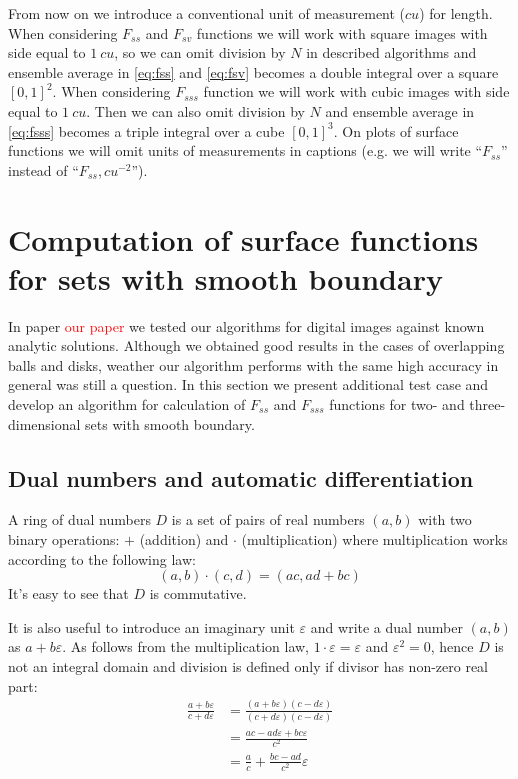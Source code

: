 \documentclass[reprint,amsmath,amssymb,aps,pre,showkeys,showpacs]{revtex4-1}
\begin{document}
From now on we introduce a conventional unit of measurement ($cu$) for length.
When considering $F_{ss}$ and $F_{sv}$ functions we will work with square images
with side equal to $1\ cu$, so we can omit division by $N$ in described
algorithms and ensemble average in \cref{eq:fss} and \cref{eq:fsv} becomes a
double integral over a square $[0, 1]^2$. When considering $F_{sss}$ function we
will work with cubic images with side equal to $1\ cu$. Then we can also omit
division by $N$ and ensemble average in \cref{eq:fsss} becomes a triple integral
over a cube $[0, 1]^3$. On plots of surface functions we will omit units of
measurements in captions (e.g. we will write ``$F_{ss}$'' instead of
``$F_{ss}, cu^{-2}$'').

\section{Computation of surface functions for sets with smooth boundary}
\label{sec:algo-precise}
In paper \textcolor{red}{our paper} we tested our algorithms for digital images
against known analytic solutions. Although we obtained good results in the cases of
overlapping balls and disks, weather our algorithm performs with the same high accuracy in
general was still a question. In this section we present additional test case and
develop an algorithm for calculation of $F_{ss}$ and $F_{sss}$ functions for
two- and three-dimensional sets with smooth boundary.

\subsection{Dual numbers and automatic differentiation}
\label{sec:dual}
A ring of dual numbers $D$ is a set of pairs of real numbers $(a, b)$ with two
binary operations: $+$ (addition) and $\cdot$ (multiplication) where
multiplication works according to the following law:
\begin{equation*}
  (a, b)\cdot(c, d) = (ac, ad + bc)
\end{equation*}
It's easy to see that $D$ is commutative.

It is also useful to introduce an imaginary unit $\varepsilon$ and write a dual number
$(a, b)$ as $a + b\varepsilon$. As follows from the multiplication law,
$1\cdot \varepsilon = \varepsilon$ and $\varepsilon^2 = 0$, hence $D$ is not an
integral domain and division is defined only if divisor has non-zero real part:
\begin{align*}
  \frac{a+b\varepsilon}{c+d\varepsilon} &=
  \frac{(a+b\varepsilon)(c-d\varepsilon)}{(c+d\varepsilon)(c-d\varepsilon)} \\
  &= \frac{ac-ad\varepsilon+bc\varepsilon}{c^2} \\
  &= \frac{a}{c} + \frac{bc-ad}{c^2}\varepsilon
\end{align*}
\end{document}
